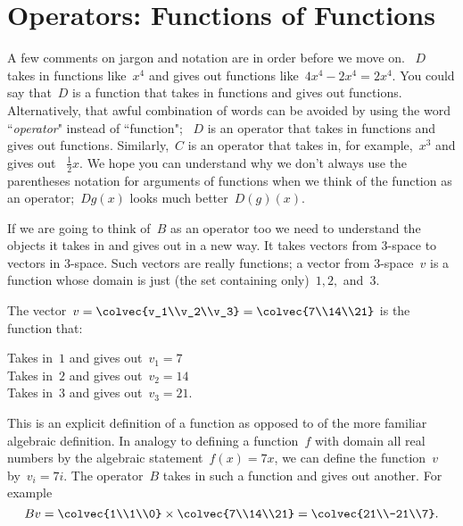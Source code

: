 
\section{Operators: Functions of Functions}
A few comments on jargon and notation are in order before we move on. ~$D$ takes in functions like~$x^4$ and gives out functions like~$4x^4-2x^4=2x^4$. You could say that~$D$ is a function that takes in functions and gives out functions.  
Alternatively, that awful combination of words can be avoided by using the word 
``{\itshape operator}" instead of ``function";
~$D$ is an operator that takes in functions and gives out functions. 
 Similarly,~$C$ is an operator that takes in, for example,~$x^3$ and gives out ~$\frac12 x$. 
We hope you can understand why we don't always use the 
parentheses notation for arguments of functions when we think of the function as an operator;~$Dg(x)$ looks much better~$D(g)(x)$.


If we are going to think of~$B$ as an operator too we need to understand the objects it takes in and gives out in a new way.
It takes vectors from 3-space to vectors in 3-space. 
Such vectors  
\hypertarget{vecs as fun}{are really functions;} 
a vector from 3-space~$v$ is a function whose domain is just (the set containing only)~$1,2,$ and~$3$. 


\begin{example}
\noindent
The vector~$v=\colvec{v_1\\v_2\\v_3}=\colvec{7\\14\\21}$ is the function that: \\[.4cm]
\null\hfill
\begin{minipage}{.5\textwidth}
Takes in~$1$ and gives out~$v_1=7$\\[1mm]
Takes in~$2$ and gives out~$v_2=14$\\[1mm]
Takes in~$3$ and gives out~$v_3=21$.
\end{minipage}
\hfill\null
\end{example}

\noindent
This is an explicit definition of a function as opposed to of the more familiar algebraic definition. In analogy to defining a function~$f$ with domain all real numbers by the algebraic statement~$f(x)=7x$, we can define the function~$v$ by~$v_i=7i$. 
The operator~$B$ takes in such a  function and gives out another. For example~\[Bv=\colvec{1\\1\\0}\times \colvec{7\\14\\21}=\colvec{21\\-21\\7}.\]


